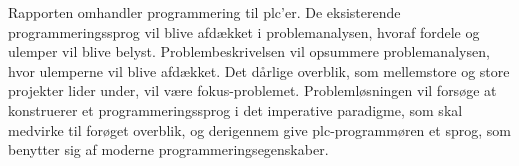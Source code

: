 Rapporten omhandler programmering til \gls{plc}'er. De eksisterende programmeringssprog vil blive afdækket i problemanalysen, hvoraf fordele og ulemper vil blive belyst. Problembeskrivelsen vil opsummere problemanalysen, hvor ulemperne vil blive afdækket. Det dårlige overblik, som mellemstore og store projekter lider under, vil være fokus-problemet. Problemløsningen vil forsøge at konstruerer et programmeringssprog i det imperative paradigme, som skal medvirke til forøget overblik, og derigennem give \gls{plc}-programmøren et sprog, som benytter sig af moderne programmeringsegenskaber.


